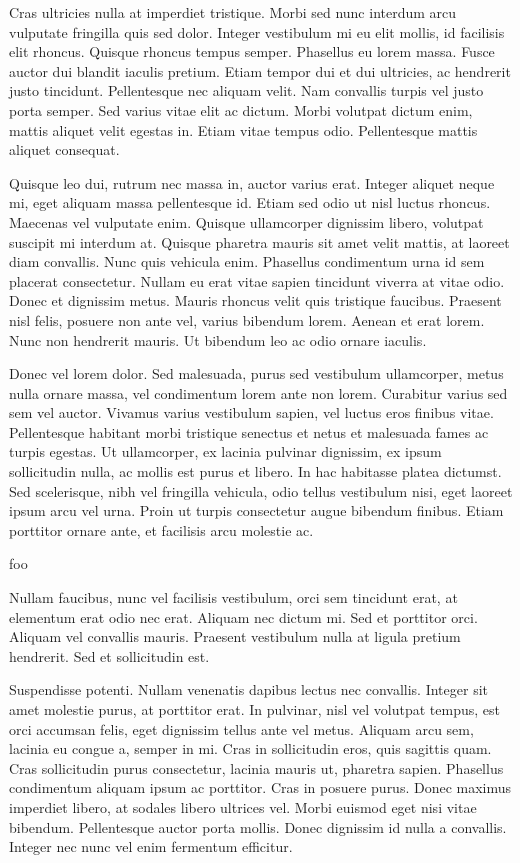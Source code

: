 \documentclass{article}
\begin{document}
Cras ultricies nulla at imperdiet tristique. Morbi sed nunc interdum arcu vulputate fringilla quis sed dolor. Integer vestibulum mi eu elit mollis, id facilisis elit rhoncus. Quisque rhoncus tempus semper. Phasellus eu lorem massa. Fusce auctor dui blandit iaculis pretium. Etiam tempor dui et dui ultricies, ac hendrerit justo tincidunt. Pellentesque nec aliquam velit. Nam convallis turpis vel justo porta semper. Sed varius vitae elit ac dictum. Morbi volutpat dictum enim, mattis aliquet velit egestas in. Etiam vitae tempus odio. Pellentesque mattis aliquet consequat.

Quisque leo dui, rutrum nec massa in, auctor varius erat. Integer aliquet neque mi, eget aliquam massa pellentesque id. Etiam sed odio ut nisl luctus rhoncus. Maecenas vel vulputate enim. Quisque ullamcorper dignissim libero, volutpat suscipit mi interdum at. Quisque pharetra mauris sit amet velit mattis, at laoreet diam convallis. Nunc quis vehicula enim. Phasellus condimentum urna id sem placerat consectetur. Nullam eu erat vitae sapien tincidunt viverra at vitae odio. Donec et dignissim metus. Mauris rhoncus velit quis tristique faucibus. Praesent nisl felis, posuere non ante vel, varius bibendum lorem. Aenean et erat lorem. Nunc non hendrerit mauris. Ut bibendum leo ac odio ornare iaculis.

Donec vel lorem dolor. Sed malesuada, purus sed vestibulum ullamcorper, metus nulla ornare massa, vel condimentum lorem ante non lorem. Curabitur varius sed sem vel auctor. Vivamus varius vestibulum sapien, vel luctus eros finibus vitae. Pellentesque habitant morbi tristique senectus et netus et malesuada fames ac turpis egestas. Ut ullamcorper, ex lacinia pulvinar dignissim, ex ipsum sollicitudin nulla, ac mollis est purus et libero. In hac habitasse platea dictumst. Sed scelerisque, nibh vel fringilla vehicula, odio tellus vestibulum nisi, eget laoreet ipsum arcu vel urna. Proin ut turpis consectetur augue bibendum finibus. Etiam porttitor ornare ante, et facilisis arcu molestie ac.

foo

Nullam faucibus, nunc vel facilisis vestibulum, orci sem tincidunt erat, at elementum erat odio nec erat. Aliquam nec dictum mi. Sed et porttitor orci. Aliquam vel convallis mauris. Praesent vestibulum nulla at ligula pretium hendrerit. Sed et sollicitudin est.

Suspendisse potenti. Nullam venenatis dapibus lectus nec convallis. Integer sit amet molestie purus, at porttitor erat. In pulvinar, nisl vel volutpat tempus, est orci accumsan felis, eget dignissim tellus ante vel metus. Aliquam arcu sem, lacinia eu congue a, semper in mi. Cras in sollicitudin eros, quis sagittis quam. Cras sollicitudin purus consectetur, lacinia mauris ut, pharetra sapien. Phasellus condimentum aliquam ipsum ac porttitor. Cras in posuere purus. Donec maximus imperdiet libero, at sodales libero ultrices vel. Morbi euismod eget nisi vitae bibendum. Pellentesque auctor porta mollis. Donec dignissim id nulla a convallis. Integer nec nunc vel enim fermentum efficitur.
\end{document}

